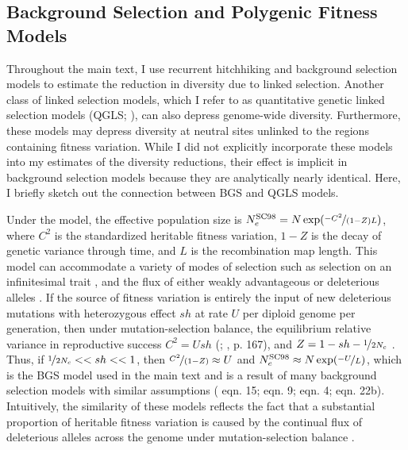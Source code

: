 \documentclass[9pt,lineno]{elife}
\begin{document}
\begin{appendixbox}
\section{Background Selection and Polygenic Fitness Models}
\label{app:bgs}

Throughout the main text, I use recurrent hitchhiking and background selection
models to estimate the reduction in diversity due to linked selection. Another
class of linked selection models, which I refer to as quantitative genetic
linked selection models (QGLS;
\cite{Robertson1961-ho,Santiago1995-hx,Santiago1998-bs}), can also depress
genome-wide diversity. Furthermore, these models may depress diversity at neutral sites unlinked to the regions containing fitness variation.  While I
did not explicitly incorporate these models into my estimates of the diversity
reductions, their effect is implicit in background selection models because
they are analytically nearly identical. Here, I briefly sketch out the
connection between BGS and QGLS models.

Under the \cite{Santiago1998-bs} model, the effective population size is
$N_e^\text{SC98} = N \exp(\nicefrac{-C^2}{(1-Z)L})$, where $C^2$ is the
standardized heritable fitness variation, $1-Z$ is the decay of genetic
variance through time, and $L$ is the recombination map length. This model can
accommodate a variety of modes of selection such as selection on an
infinitesimal trait \citep[p.  1016]{Santiago1995-hx}, and the flux of
either weakly advantageous or deleterious alleles \citep[p.
2109]{Santiago1998-bs}. If the source of fitness variation is entirely the
input of new deleterious mutations with heterozygous effect $s h$ at rate $U$
per diploid genome per generation, then under mutation-selection balance, the
equilibrium relative variance in reproductive success $C^2 = U sh$
(\cite{Crow1970-wm}; \cite{Caballero2020-wm}, p. 167), and $Z = 1 - sh -
\nicefrac{1}{2N_c}$ \citep{Santiago1998-bs}. Thus, if $\nicefrac{1}{2N_c}
<< sh << 1$, then $\nicefrac{C^2}{(1-Z)} \approx U$ and $N_e^\text{SC98}
\approx N \exp(\nicefrac{-U}{L})$, which is the BGS model used in the main text
and is a result of many background selection models with similar assumptions
(\cite{Hudson1994-oh} eqn.  15; \cite{Hudson1995-xc} eqn.  9;
\cite{Nordborg1996-nq} eqn. 4; \cite{Barton1995-pm} eqn. 22b). Intuitively, the
similarity of these models reflects the fact that a substantial proportion of
heritable fitness variation is caused by the continual flux of deleterious
alleles across the genome under mutation-selection balance
\citep{Charlesworth2015-am,Charlesworth2000-km}. 

\end{appendixbox}
\end{document}

